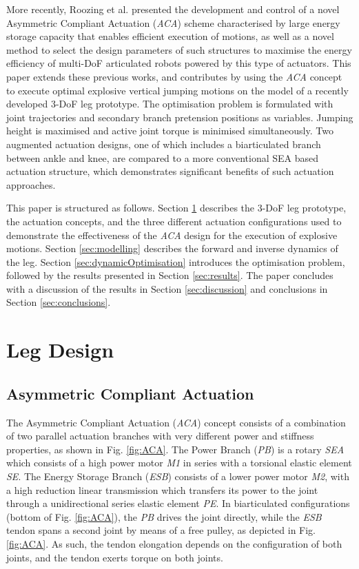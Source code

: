 \documentclass[letterpaper, 10 pt, conference]{ieeeconf}  %
\begin{document}
More recently, Roozing et al. \cite{roozing2016development, roozing2016design} presented the development and control of a novel Asymmetric Compliant Actuation (\textit{ACA}) scheme characterised by large energy storage capacity that enables efficient execution of motions, as well as a novel method to select the design parameters of such structures to maximise the energy efficiency of multi-DoF articulated robots powered by this type of actuators. This paper extends these previous works, and contributes by using the \textit{ACA} concept to execute optimal explosive vertical jumping motions on the model of a recently developed 3-DoF leg prototype. The optimisation problem is formulated with joint trajectories and secondary branch pretension positions as variables. Jumping height is maximised and active joint torque is minimised simultaneously. Two augmented actuation designs, one of which includes a biarticulated branch between ankle and knee, are compared to a more conventional SEA based actuation structure, which demonstrates significant benefits of such actuation approaches.

This paper is structured as follows. Section \ref{sec:legDesign} describes the 3-DoF leg prototype, the actuation concepts, and the three different actuation configurations used to demonstrate the effectiveness of the \textit{ACA} design for the execution of explosive motions. Section \ref{sec:modelling} describes the forward and inverse dynamics of the leg. Section \ref{sec:dynamicOptimisation} introduces the optimisation problem, followed by the results presented in Section \ref{sec:results}. The paper concludes with a discussion of the results in Section \ref{sec:discussion} and conclusions in Section \ref{sec:conclusions}.


\section{Leg Design}
\label{sec:legDesign}

\subsection{Asymmetric Compliant Actuation}
\label{subsec:ACA}
The Asymmetric Compliant Actuation (\textit{ACA}) concept consists of a combination of two parallel actuation branches with very different power and stiffness properties, as shown in Fig. \ref{fig:ACA}. The Power Branch (\textit{PB}) is a rotary \textit{SEA} which consists of a high power motor \textit{M1} in series with a torsional elastic element \textit{SE}. The Energy Storage Branch (\textit{ESB}) consists of a lower power motor \textit{M2}, with a high reduction linear transmission which transfers its power to the joint through a unidirectional series elastic element \textit{PE}. In biarticulated configurations (bottom of Fig. \ref{fig:ACA}), the \textit{PB} drives the joint directly, while the \textit{ESB} tendon spans a second joint by means of a free pulley, as depicted in Fig. \ref{fig:ACA}. As such, the tendon elongation depends on the configuration of both joints, and the tendon exerts torque on both joints.
\end{document}
